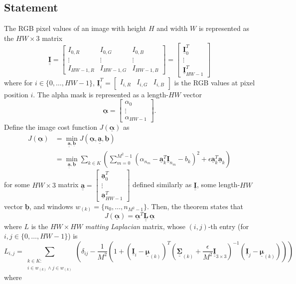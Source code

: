 \documentclass{article}
\newcommand{\bmat}[1]{\begin{bmatrix}#1\end{bmatrix}}
\theoremstyle{definition}
\def\vt#1{\underline{\mathbf{#1}}}
\def\vts#1{\underline{\boldsymbol{#1}}}
\def\mt#1{\underline{\underline{\mathbf{#1}}}}
\def\mts#1{\underline{\underline{\boldsymbol{#1}}}}
\begin{document}
\subsection{Statement}\label{appendix:theorem-1-statement}
The RGB pixel values of an image with height $H$ and width $W$ is represented as the $HW\times3$ matrix
$$\mt I = \bmat{
    I_{0,R} & I_{0,G} &  I_{0,B} \\
    \vdots & \vdots & \vdots \\
    I_{HW-1,R} & I_{HW-1,G} &  I_{HW-1,B}
} = \bmat{\vt I_0^T \\ \vdots \\ \vt I_{HW-1}^T}$$
where for $i\in\{0,\dots,HW-1\}$, $\vt I_i^T = \bmat{I_{i,R} & I_{i,G} & I_{i, B}}$ is the RGB values at pixel position $i$. The alpha mask is represented as a length-$HW$ vector
$$\vts\alpha = \bmat{\alpha_0\\\vdots\\\alpha_{HW-1}}.$$
Define the image cost function $J(\vts\alpha)$ as
\begin{align*}
    J(\vts\alpha) &= \min_{\mt a,\vt b} J(\vts\alpha, \mt a, \vt b)\\
    &= \min_{\mt a,\vt b} \sum_{k\in K} \left(\sum_{m=0}^{M^2-1} \left(\alpha_{n_m} - \vt a_k^T \vt I_{n_m} - b_k\right)^2 + \epsilon \vt a_k^T \vt a_k \right)%
\end{align*}
for some $HW\times 3$ matrix $\mt a=\left[\begin{smallmatrix}\vt a_{0}^T \\ \vdots \\ \vt a_{HW-1}^T\end{smallmatrix}\right]$ defined similarly as $\mt I$, some length-$HW$ vector $\vt b$, and windows $w_{(k)}=\{n_0,\dots,n_{M^2-1}\}$. Then, the theorem states that
$$J(\vts \alpha) = \vts \alpha^T \mt L\, \vts \alpha$$
where $L$ is the $HW\times HW$ \emph{matting Laplacian} matrix, whose $(i,j)$-th entry (for $i,j\in\{0,\dots,HW-1\}$) is
$$L_{i,j} = \sum_{\substack{k\in K:\\i\in w_{(k)}\wedge j\in w_{(k)}}} \left( \delta_{ij} - \frac1{M^2}\left(1 + \left(\vt{I}_i - \vts \mu_{(k)}\right)^T \left(\mts \Sigma_{(k)} + \frac\epsilon{M^2} \mt{I}_{3\times 3}\right)^{-1} \left(\vt{I}_j - \vts \mu_{(k)}\right) \right) \right)$$
where
\end{document}
